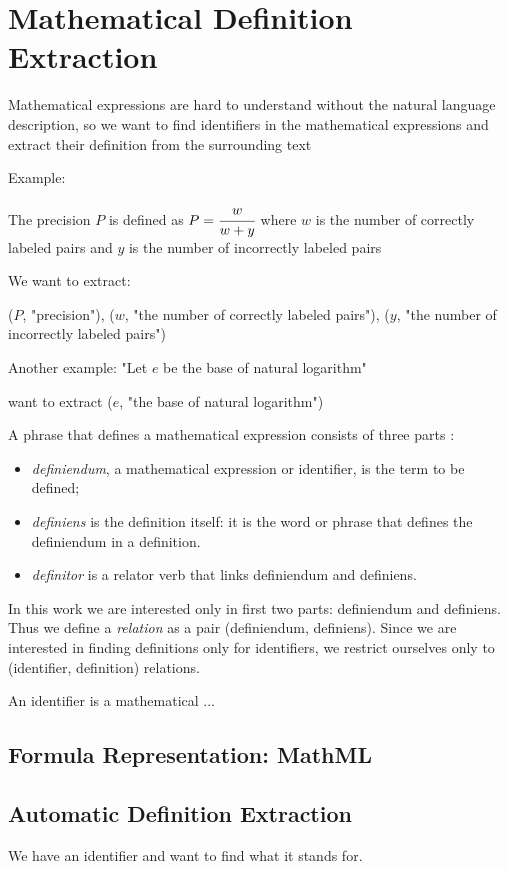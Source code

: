 \section{Mathematical Definition Extraction}
Mathematical expressions are hard to understand without the natural language description, 
so we want to find identifiers in the mathematical expressions and extract their 
definition from the surrounding text

Example:

The precision $P$ is defined as $P = \cfrac{w}{w + y}$ where $w$ is the number of 
correctly labeled pairs and $y$ is the number of incorrectly labeled pairs

We want to extract:

($P$, "precision"), 
($w$, "the number of correctly labeled pairs"),
($y$, "the number of incorrectly labeled pairs")

Another example: "Let $e$ be the base of natural logarithm"

want to extract ($e$, "the base of natural logarithm")


A phrase that defines a mathematical expression consists of three parts \cite{kristianto2012extracting}: 

\begin{itemize}
  \item \emph{definiendum}, a mathematical expression or identifier, is the term to be defined;
  \item \emph{definiens} is the definition itself: it is the word or phrase that defines the definiendum in a definition.
  \item \emph{definitor} is a relator verb that links definiendum and definiens.
\end{itemize}
 
In this work we are interested only in first two parts: definiendum and definiens. 
Thus we define a \emph{relation} as a pair (definiendum, definiens). Since we are 
interested in finding definitions only for identifiers, we restrict ourselves only
to (identifier, definition) relations.


An identifier is a mathematical ...


\subsection{Formula Representation: MathML}

\cite{mathml}

\subsection{Automatic Definition Extraction}
We have an identifier and want to find what it stands for.

